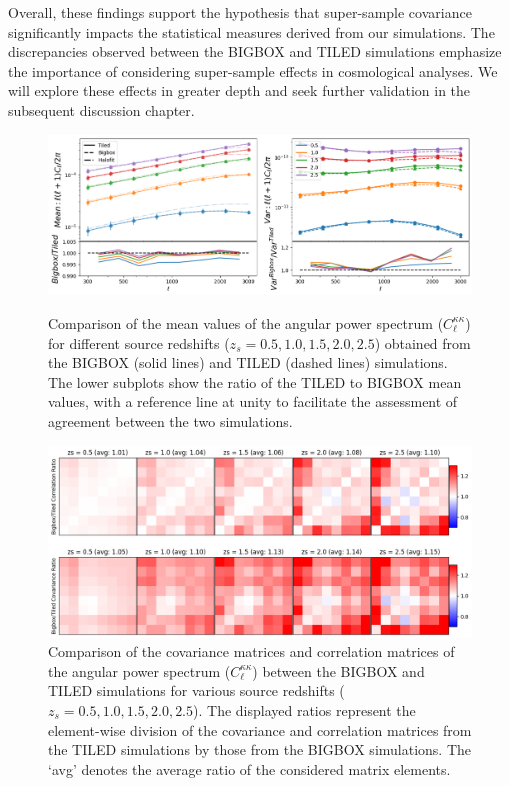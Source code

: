Overall, these findings support the hypothesis that super-sample covariance significantly impacts the statistical measures derived from our simulations. The discrepancies observed between the BIGBOX and TILED simulations emphasize the importance of considering super-sample effects in cosmological analyses. We will explore these effects in greater depth and seek further validation in the subsequent discussion chapter.

\begin{figure}[p]
    \centering
    \includegraphics[width=\textwidth]{figures/results/cl_main.png}
    \caption{Comparison of the mean values of the angular power spectrum ($C^{\kappa\kappa}_{\ell}$) for different source redshifts ($z_s = 0.5, 1.0, 1.5, 2.0, 2.5$) obtained from the BIGBOX (solid lines) and TILED (dashed lines) simulations. The lower subplots show the ratio of the TILED to BIGBOX mean values, with a reference line at unity to facilitate the assessment of agreement between the two simulations.}
    \label{fig:cl_main}
    \vspace{2cm}
    \includegraphics[width=\textwidth]{figures/results/cl_cov.png}
    \caption{Comparison of the covariance matrices and correlation matrices of the angular power spectrum ($C^{\kappa\kappa}_{\ell}$) between the BIGBOX and TILED simulations for various source redshifts ($z_s = 0.5, 1.0, 1.5, 2.0, 2.5$). The displayed ratios represent the element-wise division of the covariance and correlation matrices from the TILED simulations by those from the BIGBOX simulations. The `avg' denotes the average ratio of the considered matrix elements.}
    \label{fig:cl_cov}
\end{figure}

